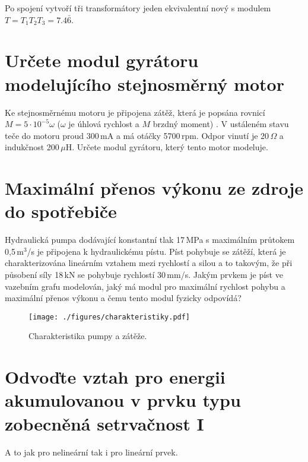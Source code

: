 \documentclass[twoside]{article}
\begin{document}
Po spojení vytvoří tři transformátory jeden ekvivalentní nový s modulem $T = T_1 T_2 T_3 = 7.4\bar{6}$.

\section{Určete modul gyrátoru modelujícího stejnosměrný motor}
Ke stejnosměrnému motoru je připojena zátěž, která je popsána rovnicí $M=5\cdot10^{-5}\omega$ ($\omega$ je úhlová rychlost a $M$ brzdný moment) .
V ustáleném stavu teče do motoru proud 300\,mA a má otáčky 5700\,rpm. Odpor vinutí je 20\,$\Omega$ a indukčnost 200\,$\mu$H. Určete modul gyrátoru, který tento motor modeluje. 

\vspace{6cm}

\section{Maximální přenos výkonu ze zdroje do spotřebiče}
Hydraulická pumpa dodávající konstantní tlak 17\,MPa s maximálním průtokem 0,5\,m$^3$/s je připojena k hydraulickému pístu. Píst pohybuje se zátěží, která je charakterizována lineárním vztahem mezi rychlostí a silou a to takovým, že při působení síly 18\,kN se pohybuje rychlostí 30\,mm/s. Jakým prvkem je píst ve vazebním grafu modelován, jaký má modul pro maximální rychlost pohybu a maximální přenos výkonu a čemu tento modul fyzicky odpovídá?

\begin{figure}[h!]
	\centering
	\texttt{[image: ./figures/charakteristiky.pdf]}
	\caption{Charakteristika pumpy a zátěže.}
\end{figure}


\vspace{6cm}

\section{Odvoďte vztah pro energii akumulovanou v prvku typu zobecněná setrvačnost I}
A to jak pro nelineární tak i pro lineární prvek.
\end{document}
